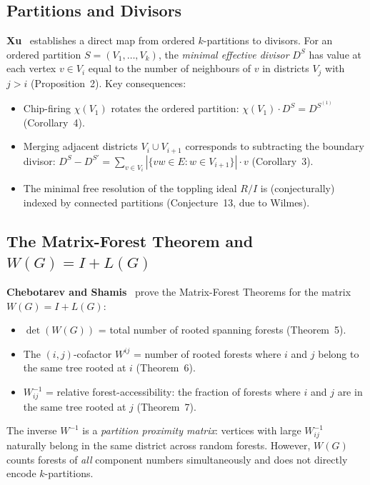 \documentclass[11pt]{article}
\begin{document}
\subsection{Partitions and Divisors}

\textbf{Xu}~\cite{xu2011partitions} establishes a direct map from ordered
$k$-partitions to divisors. For an ordered partition $S = (V_1, \ldots, V_k)$,
the \emph{minimal effective divisor} $D^S$ has value at each vertex $v \in V_i$
equal to the number of neighbours of $v$ in districts $V_j$ with $j > i$
(Proposition~2). Key consequences:
\begin{itemize}
  \item Chip-firing $\chi(V_1)$ rotates the ordered partition:
    $\chi(V_1) \cdot D^S = D^{S^{(1)}}$ (Corollary~4).
  \item Merging adjacent districts $V_i \cup V_{i+1}$ corresponds to
    subtracting the boundary divisor: $D^S - D^{S'} = \sum_{v \in V_i}
    |\{vw \in E : w \in V_{i+1}\}| \cdot v$ (Corollary~3).
  \item The minimal free resolution of the toppling ideal $R/I$ is
    (conjecturally) indexed by connected partitions (Conjecture~13, due to
    Wilmes).
\end{itemize}

\subsection{The Matrix-Forest Theorem and $W(G) = I + L(G)$}

\textbf{Chebotarev and Shamis}~\cite{chebotarev2006forest} prove the
Matrix-Forest Theorems for the matrix $W(G) = I + L(G)$:
\begin{itemize}
  \item $\det(W(G))$ = total number of rooted spanning forests (Theorem~5).
  \item The $(i,j)$-cofactor $W^{ij}$ = number of rooted forests where $i$ and
    $j$ belong to the same tree rooted at $i$ (Theorem~6).
  \item $W^{-1}_{ij}$ = relative forest-accessibility: the fraction of forests
    where $i$ and $j$ are in the same tree rooted at $j$ (Theorem~7).
\end{itemize}
The inverse $W^{-1}$ is a \emph{partition proximity matrix}: vertices with
large $W^{-1}_{ij}$ naturally belong in the same district across random
forests. However, $W(G)$ counts forests of \emph{all} component numbers
simultaneously and does not directly encode $k$-partitions.
\end{document}
